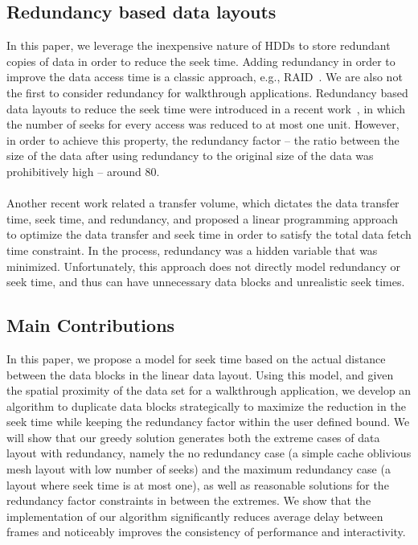 \documentclass[conference]{acmsiggraph}
\begin{document}
\subsection{Redundancy based data layouts}

In this paper, we leverage the inexpensive nature of HDDs to store redundant copies of data in order to reduce the seek time. Adding redundancy in order to improve the data access time is a classic approach, e.g., RAID~\cite{Patterson88}.  We are also not the first to consider redundancy for walkthrough applications.  Redundancy based data layouts to reduce the seek time were introduced in a recent work~\cite{singleseeklayout}, in which the number of seeks for every access was reduced to at most one unit. However, in order to achieve this property, the redundancy factor -- the ratio between the size of the data after using redundancy to the original size of the data was prohibitively high -- around 80. \\
\\
Another recent work \cite{optimizingredundancy} related a transfer volume, which dictates the data transfer time, seek time, and redundancy, and proposed a linear programming approach to optimize the data transfer and seek time in order to satisfy the total data fetch time constraint. In the process, redundancy was a hidden variable that was minimized. Unfortunately, this approach does not directly model redundancy or seek time, and thus can have unnecessary data blocks and unrealistic seek times. 

\subsection{Main Contributions}

In this paper, we propose a model for seek time based on the actual distance between the data blocks in the linear data layout. Using this model, and given the spatial proximity of the data set for a walkthrough application, we develop an algorithm to duplicate data blocks strategically to maximize the reduction in the seek time while keeping the redundancy factor within the user defined bound. We will show that our greedy solution generates both the extreme cases of data layout with redundancy, namely the no redundancy case (a simple cache oblivious mesh layout with low number of seeks) and the maximum redundancy case (a layout where seek time is at most one), as well as reasonable solutions for the redundancy factor constraints in between the extremes. We show that the implementation of our algorithm significantly reduces average delay between frames and noticeably improves the consistency of performance and interactivity.
\end{document}

